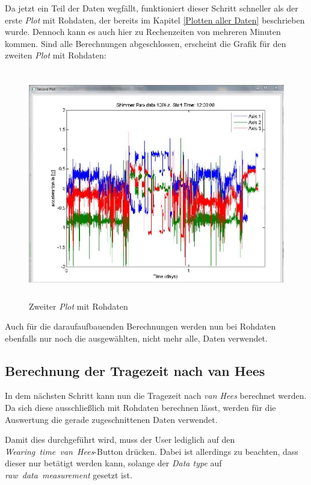 \documentclass[onecolumn,german]{article}
\begin{document}
Da jetzt ein Teil der Daten wegfällt, funktioniert dieser Schritt schneller als der erste \textit{Plot} mit Rohdaten, der bereits im Kapitel \ref{Plotten aller Daten} beschrieben wurde. Dennoch kann es auch hier zu Rechenzeiten von mehreren Minuten kommen. Sind alle Berechnungen abgeschlossen, erscheint die Grafik für den zweiten \textit{Plot} mit Rohdaten:

\begin{figure}[H]
\centerline{
\includegraphics[width=125mm, height=100mm]{Abbildungen/SecondPlot_RAW.JPG}
}
\caption {Zweiter \textit{Plot} mit Rohdaten}
\label{secondPlot_RAW}
\end{figure}

Auch für die daraufaufbauenden Berechnungen werden nun bei Rohdaten ebenfalls nur noch die ausgewählten, nicht mehr alle, Daten verwendet.

\subsection{Berechnung der Tragezeit nach van Hees}

In dem nächsten Schritt kann nun die Tragezeit nach \textit{van Hees} berechnet werden. Da sich diese ausschließlich mit Rohdaten berechnen lässt, werden für die Auswertung die gerade zugeschnittenen Daten verwendet.

Damit dies durchgeführt wird, muss der User lediglich auf den \mbox{\textit{Wearing time van Hees}-Button} drücken. Dabei ist allerdings zu beachten, dass dieser nur betätigt werden kann, solange der \textit{Data type} auf  \mbox{\textit{raw data measurement}} gesetzt ist.
\end{document}

